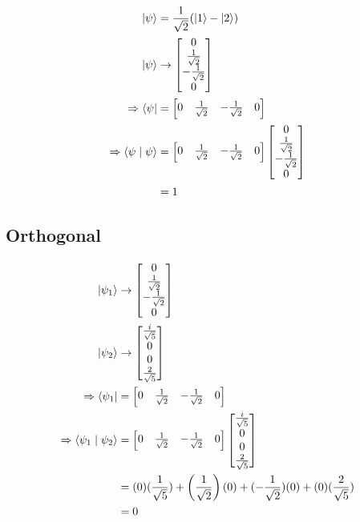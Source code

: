 \begin{align}
\ket{\psi} &= \frac{1}{\sqrt{2}}(\ket{1}-\ket{2}) \\
\ket{\psi} &\rightarrow \begin{bmatrix} 0 \\ \frac{1}{\sqrt{2}} \\ -\frac{1}{\sqrt{2}} \\ 0 \end{bmatrix} \\
\Rightarrow \bra{\psi} &= \begin{bmatrix} 0 & \frac{1}{\sqrt{2}} & -\frac{1}{\sqrt{2}} & 0 \end{bmatrix} \\
\Rightarrow \braket{\psi \mid \psi} &= \begin{bmatrix} 0 & \frac{1}{\sqrt{2}} & -\frac{1}{\sqrt{2}} & 0 \end{bmatrix} \begin{bmatrix} 0 \\ \frac{1}{\sqrt{2}} \\ -\frac{1}{\sqrt{2}} \\ 0 \end{bmatrix} \\
&= 1
\end{align}



\subsection{Orthogonal}

\begin{align}
\ket{\psi_1} &\rightarrow \begin{bmatrix} 0 \\ \frac{1}{\sqrt{2}} \\ -\frac{1}{\sqrt{2}} \\ 0 \end{bmatrix} \\
\ket{\psi_2} &\rightarrow \begin{bmatrix} \frac{i}{\sqrt{5}} \\ 0 \\ 0 \\ \frac{2}{\sqrt{5}} \end{bmatrix} \\
\Rightarrow \bra{\psi_1} &= \begin{bmatrix} 0 & \frac{1}{\sqrt{2}} & -\frac{1}{\sqrt{2}} & 0 \end{bmatrix} \\
\Rightarrow \braket{\psi_1 \mid \psi_2} &= \begin{bmatrix} 0 & \frac{1}{\sqrt{2}} & -\frac{1}{\sqrt{2}} & 0 \end{bmatrix} \begin{bmatrix} \frac{i}{\sqrt{5}} \\ 0 \\ 0 \\ \frac{2}{\sqrt{5}} \end{bmatrix} \\
&= (0)(\frac{1}{\sqrt{5}}) + \left(\frac{1}{\sqrt{2}}\right)(0) + (-\frac{1}{\sqrt{2}})(0) + (0)(\frac{2}{\sqrt{5}}) \\
&= 0
\end{align}


